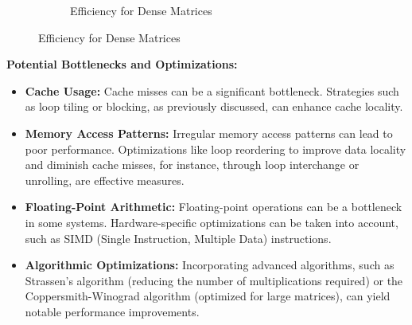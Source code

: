 \documentclass{article}
\begin{document}
\begin{figure}[h!tb]
\begin{subfigure}{0.49\textwidth}
        \caption*{Efficiency for Dense Matrices}
        \label{fig:Efficiency_dense}
    \end{subfigure}
\end{figure}

\clearpage

\textbf{Potential Bottlenecks and Optimizations:}

\begin{itemize}
    \item \textbf{Cache Usage:} Cache misses can be a significant bottleneck. Strategies such as loop tiling or blocking, as previously discussed, can enhance cache locality.
    \item \textbf{Memory Access Patterns:} Irregular memory access patterns can lead to poor performance. Optimizations like loop reordering to improve data locality and diminish cache misses, for instance, through loop interchange or unrolling, are effective measures.
    \item \textbf{Floating-Point Arithmetic:} Floating-point operations can be a bottleneck in some systems. Hardware-specific optimizations can be taken into account, such as SIMD (Single Instruction, Multiple Data) instructions.
    \item \textbf{Algorithmic Optimizations:} Incorporating advanced algorithms, such as Strassen’s algorithm (reducing the number of multiplications required) or the Coppersmith-Winograd algorithm (optimized for large matrices), can yield notable performance improvements.
\end{itemize}
\end{document}
